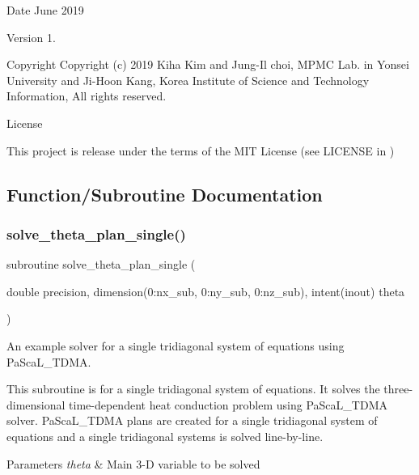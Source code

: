 \begin{DoxyDate}{Date}
June 2019 
\end{DoxyDate}
\begin{DoxyVersion}{Version}
1. 
\end{DoxyVersion}
\begin{DoxyParagraph}{Copyright}
Copyright (c) 2019 Kiha Kim and Jung-\/\+Il choi, M\+P\+MC Lab. in Yonsei University and Ji-\/\+Hoon Kang, Korea Institute of Science and Technology Information, All rights reserved. 
\end{DoxyParagraph}
\begin{DoxyParagraph}{License }

\end{DoxyParagraph}
This project is release under the terms of the M\+IT License (see L\+I\+C\+E\+N\+SE in ) 

\subsection{Function/\+Subroutine Documentation}
\mbox{\label{solve__theta__plan__single_8f90_a53ef6756822306f33a47be6a66232862}} 
\subsubsection{\texorpdfstring{solve\_theta\_plan\_single()}{solve\_theta\_plan\_single()}}
{\footnotesize\ttfamily subroutine solve\+\_\+theta\+\_\+plan\+\_\+single (\begin{DoxyParamCaption}\item[{double precision, dimension(0\+:nx\+\_\+sub, 0\+:ny\+\_\+sub, 0\+:nz\+\_\+sub), intent(inout)}]{theta }\end{DoxyParamCaption})}



An example solver for a single tridiagonal system of equations using Pa\+Sca\+L\+\_\+\+T\+D\+MA. 

This subroutine is for a single tridiagonal system of equations. It solves the three-\/dimensional time-\/dependent heat conduction problem using Pa\+Sca\+L\+\_\+\+T\+D\+MA solver. Pa\+Sca\+L\+\_\+\+T\+D\+MA plans are created for a single tridiagonal system of equations and a single tridiagonal systems is solved line-\/by-\/line. 
\begin{DoxyParams}{Parameters}
{\em theta} & Main 3-\/D variable to be solved \\
\hline
\end{DoxyParams}


